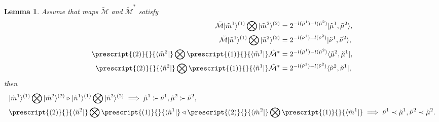 \documentclass[11pt,reqno]{amsart}
\numberwithin{equation}{section}
\newtheorem{lemma}[theorem]{Lemma}
\begin{document}
	\begin{lemma}\label{xr-jc-1}
		Assume that   maps   $\tilde{\mathcal{M}} $ and $\tilde{\mathcal{M}}^*$  satisfy
		\begin{align}\label{M-map}
			\tilde{\mathcal{M}}  | \tilde{m}^{1}\rangle^{(1)}\bigotimes|\tilde{m}^{2}\rangle^{(2)}&=
			2^{-l(\tilde{\mu}^{1})-l(\tilde{\mu}^{2})}	
			| \tilde{\mu}^{1},\tilde{\mu}^{2} \rangle , 	\\
			\tilde{\mathcal{M}}  | \tilde{n}^{1}\rangle^{(1)}\bigotimes|\tilde{n}^{2}\rangle^{(2)}&=
			2^{-l(\tilde{\nu}^{1})-l(\tilde{\nu}^{2})}	
			| \tilde{\nu}^{1},\tilde{\nu}^{2} \rangle, \\
			\prescript{(2)}{}{\langle \tilde{m}^{2}|}\bigotimes \prescript{(1)}{}{\langle \tilde{m}^{1}|}  \tilde{\mathcal{M}}^* &=
			2^{-l(\tilde{\mu}^{1})-l(\tilde{\mu}^{2})}	
			\langle \tilde{\mu}^{2},\tilde{\mu}^{1}|, \\	
			\prescript{(2)}{}{\langle \tilde{n}^{2}|}\bigotimes \prescript{(1)}{}{\langle \tilde{n}^{1}|}  \tilde{\mathcal{M}}^* &=
			2^{-l(\tilde{\nu}^{1})-l(\tilde{\nu}^{2})}	
			\langle \tilde{\nu}^{2},\tilde{\nu}^{1}| ,
		\end{align}	
		then
		\begin{align}
			&| \tilde{m}^{1}\rangle^{(1)}\bigotimes|\tilde{m}^{2}\rangle^{(2)} \triangleright  | \tilde{n}^{1}\rangle^{(1)}\bigotimes|\tilde{n}^{2}\rangle^{(2)}
			\implies
			\tilde{\mu}^{1}  \succ  \tilde{\nu}^{1} ,\tilde{\mu}^{2}  \succ  \tilde{\nu}^{2} , \label{r-admiss-interlace}\\
			&\prescript{(2)}{}{\langle \tilde{n}^{2}|}\bigotimes \prescript{(1)}{}{\langle \tilde{n}^{1}|}
			\triangleleft
			\prescript{(2)}{}{\langle \tilde{m}^{2}|}\bigotimes \prescript{(1)}{}{\langle \tilde{m}^{1}|}
			\implies  \tilde{\nu}^{1}  \prec  \tilde{\mu}^{1} , \tilde{\nu}^{2} \prec  \tilde{\mu}^{2}.	 \label{l-admiss-interlace}
		\end{align}	
	\end{lemma}
	
\end{document}
